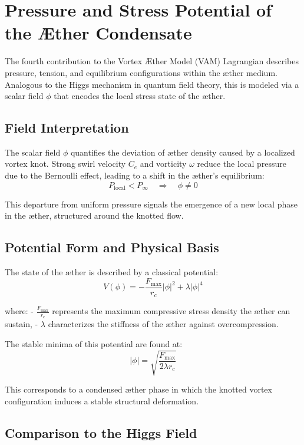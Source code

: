 \section{Pressure and Stress Potential of the Æther Condensate}

The fourth contribution to the Vortex Æther Model (VAM) Lagrangian describes pressure, tension, and equilibrium configurations within the æther medium. Analogous to the Higgs mechanism in quantum field theory, this is modeled via a scalar field $\phi$ that encodes the local stress state of the æther.

\subsection*{Field Interpretation}

The scalar field $\phi$ quantifies the deviation of æther density caused by a localized vortex knot. Strong swirl velocity $C_e$ and vorticity $\omega$ reduce the local pressure due to the Bernoulli effect, leading to a shift in the æther’s equilibrium:
\[
    P_\text{local} < P_\infty \quad \Rightarrow \quad \phi \neq 0
\]

This departure from uniform pressure signals the emergence of a new local phase in the æther, structured around the knotted flow.

\subsection*{Potential Form and Physical Basis}

The state of the æther is described by a classical potential:
\[
    V(\phi) = -\frac{F_\text{max}}{r_c} |\phi|^2 + \lambda |\phi|^4
\]

where:
- $\frac{F_\text{max}}{r_c}$ represents the maximum compressive stress density the æther can sustain,
- $\lambda$ characterizes the stiffness of the æther against overcompression.

The stable minima of this potential are found at:
\[
    |\phi| = \sqrt{\frac{F_\text{max}}{2\lambda r_c}}
\]

This corresponds to a condensed æther phase in which the knotted vortex configuration induces a stable structural deformation.

\subsection*{Comparison to the Higgs Field}


